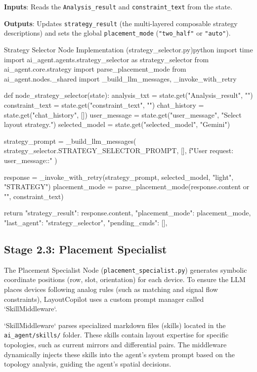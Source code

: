 \textbf{Inputs}: Reads the \texttt{Analysis\_result} and \texttt{constraint\_text} from the state.

\textbf{Outputs}: Updates \texttt{strategy\_result} (the multi-layered composable strategy descriptions) and sets the global \texttt{placement\_mode} (\texttt{"two\_half"} or \texttt{"auto"}).

\begin{thesiscode}{Strategy Selector Node Implementation (strategy\_selector.py)}{python}
import time
import ai_agent.agents.strategy_selector as strategy_selector
from ai_agent.core.strategy import parse_placement_mode
from ai_agent.nodes._shared import _build_llm_messages, _invoke_with_retry

def node_strategy_selector(state):
    analysis_txt = state.get("Analysis_result", "")
    constraint_text = state.get("constraint_text", "")
    chat_history = state.get("chat_history", [])
    user_message = state.get("user_message", "Select layout strategy.")
    selected_model = state.get("selected_model", "Gemini")

    strategy_prompt = _build_llm_messages(
        strategy_selector.STRATEGY_SELECTOR_PROMPT, [],
        f"User request: {user_message}\n\nAnalysis:\n\nConstraints:\n\n"
    )
    
    response = _invoke_with_retry(strategy_prompt, selected_model, "light", "STRATEGY")
    placement_mode = parse_placement_mode(response.content or "", constraint_text)

    return {
        "strategy_result": response.content,
        "placement_mode": placement_mode,
        "last_agent": "strategy_selector",
        "pending_cmds": [],
    }
\end{thesiscode}

\subsection{Stage 2.3: Placement Specialist}
The Placement Specialist Node (\texttt{placement\_specialist.py}) generates symbolic coordinate positions (row, slot, orientation) for each device. To ensure the LLM places devices following analog rules (such as matching and signal flow constraints), LayoutCopilot uses a custom prompt manager called `SkillMiddleware`.

`SkillMiddleware` parses specialized markdown files (skills) located in the \texttt{ai\_agent/skills/} folder. These skills contain layout expertise for specific topologies, such as current mirrors and differential pairs. The middleware dynamically injects these skills into the agent's system prompt based on the topology analysis, guiding the agent's spatial decisions.

